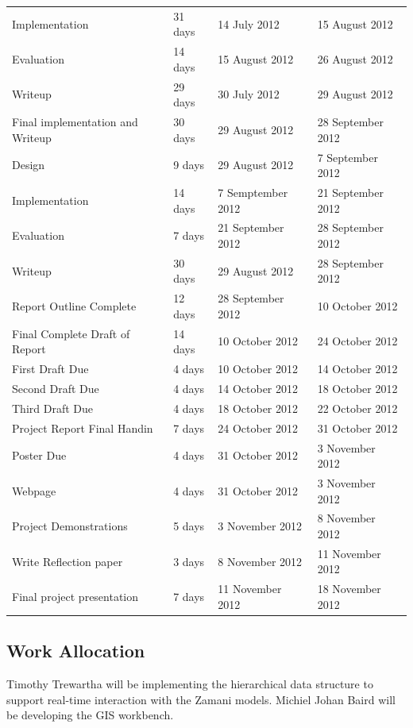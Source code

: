 \documentclass[12pt,a4paper]{article}
\begin{document}
\begin{tabular}{l||l|l|l}
    \indent Implementation & 31 days & 14 July 2012 & 15 August 2012 \\
    \indent Evaluation & 14 days & 15 August 2012 & 26 August 2012  \\
    \indent Writeup & 29 days & 30 July 2012 & 29 August 2012 \\
    \hline
    Final implementation and Writeup & 30 days & 29 August 2012 & 28 September 2012 \\
    \indent Design & 9 days   & 29 August 2012  & 7 September 2012 \\
    \indent Implementation & 14 days & 7 Semptember 2012 & 21 September 2012 \\
    \indent Evaluation & 7 days & 21 September 2012  & 28 September 2012 \\
    \indent Writeup & 30 days & 29 August 2012 & 28 September 2012 \\
    \hline
    Report Outline Complete & 12 days  &28 September 2012 & 10 October 2012 \\
    \hline
    Final Complete Draft of Report & 14 days & 10 October 2012 & 24 October 2012 \\
    \indent First Draft Due & 4 days &10 October 2012 & 14 October 2012 \\
    \indent Second Draft Due & 4 days &14 October 2012 & 18 October 2012 \\
    \indent Third Draft Due & 4 days  &18 October 2012 & 22 October 2012 \\
    \hline
    Project Report Final Handin & 7 days & 24 October 2012 & 31 October 2012 \\
    \hline
    Poster Due & 4 days  & 31 October 2012 & 3 November 2012 \\
    \hline
    Webpage & 4 days & 31 October 2012 & 3 November 2012 \\
    \hline
    Project Demonstrations & 5 days & 3 November 2012 & 8 November 2012 \\
    \hline
    Write Reflection paper &3 days & 8 November 2012 & 11 November 2012 \\
    \hline
    Final project presentation & 7 days &11 November 2012 & 18 November 2012 \\

\end{tabular}

\subsection{Work Allocation}
Timothy Trewartha will be implementing the hierarchical data structure to support
real-time interaction with the Zamani models. Michiel Johan Baird will be developing
the GIS workbench.






\end{document}
